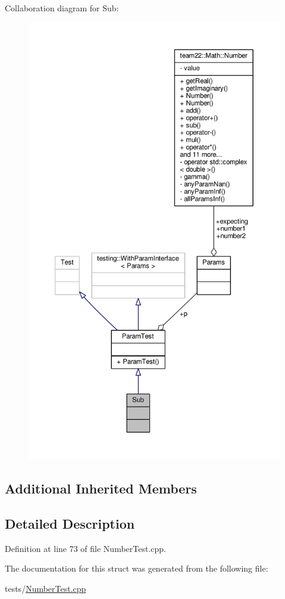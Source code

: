 Collaboration diagram for Sub\+:
\nopagebreak
\begin{figure}[H]
\begin{center}
\leavevmode
\includegraphics[height=550pt]{struct_sub__coll__graph}
\end{center}
\end{figure}
\subsection*{Additional Inherited Members}


\subsection{Detailed Description}


Definition at line 73 of file Number\+Test.\+cpp.



The documentation for this struct was generated from the following file\+:\begin{DoxyCompactItemize}
\item 
tests/\hyperlink{_number_test_8cpp}{Number\+Test.\+cpp}\end{DoxyCompactItemize}
